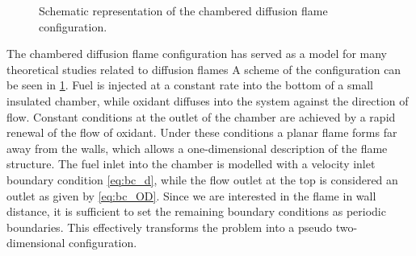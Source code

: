 {\begin{figure}[b!]
\begin{center}
		\caption{Schematic representation of the chambered diffusion flame configuration. }
		\label{fig:chamberedDifFlame}
	\end{center}	
\end{figure}
The chambered diffusion flame configuration has served as a model for many theoretical studies related to diffusion flames\cite{matalonEffectThermalExpansion2010,rameauNumericalBifurcationChambered1985,matalonDiffusionFlamesChamber1980} A scheme of the configuration can be seen in \cref{fig:chamberedDifFlame}. Fuel is injected at a constant rate into the bottom of a small insulated chamber, while oxidant diffuses into the system against the direction of flow. Constant conditions at the outlet of the chamber are achieved by a rapid renewal of the flow of oxidant.  Under these conditions a planar flame forms far away from the walls, which allows a one-dimensional description of the flame structure.
The fuel inlet into the chamber is modelled with a velocity inlet boundary condition \cref{eq:bc_d}, while the flow outlet at the top is considered an outlet as given by \cref{eq:bc_OD}. Since we are interested in the flame in wall distance, it is sufficient to set the remaining boundary conditions as periodic boundaries. This effectively transforms the problem into a pseudo two-dimensional configuration. 


}
